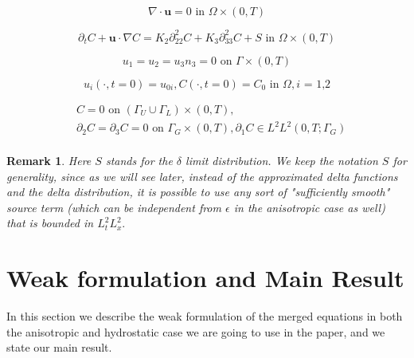 \documentclass[11pt]{article}
\newtheorem{remark}{Remark}
\begin{document}
    \begin{equation} \label{HNSC4}   
    \nabla \cdot \mathbf{u} = 0 \text{ in } \Omega \times (0,T)
    \end{equation}
    
    \begin{equation} \label{HNSC5}   
    \partial_t C + \mathbf{u} \cdot \nabla C = K_2 \partial_{22} ^ 2 C + K_3 \partial_{33} ^2 C + S \text{ in } \Omega \times (0,T)
    \end{equation}
    
    \begin{equation} \label{HNSC6}   
    u_1 = u_2 = u_3 n_3 = 0 \text{ on } \Gamma \times (0,T)
    \end{equation}
    
    \begin{equation} \label{HNSC7}   
    u_i (\cdot, t=0) = u_{0 i}, C (\cdot, t=0) = C_0 \text{ in } \Omega, \text{$i$ = 1,2}
    \end{equation}
    
    \begin{equation} \label{HNSC8}
      \begin{split}
        &C = 0 \text{ on } ( \Gamma_U \cup \Gamma_L) \times (0,T), \\
        & \partial_2 C = \partial_3 C = 0 \text{ on } \Gamma_G \times (0,T), \partial_1 C \in L^2 L^2 (0,T; \Gamma_G) \\
      \end{split}
    \end{equation}
    
  \begin{remark}
    Here $S$ stands for the $\delta$ limit distribution. We keep the notation $S$ for generality, since as we will see later, instead of the approximated delta functions and the delta distribution, it is possible to use any sort of "sufficiently smooth" source term (which can be independent from $\epsilon$ in the anisotropic case as well) that is bounded in $L^2_t L^2_x.$
  \end{remark}

\section{Weak formulation and Main Result} \label{weakformulationmainresult}

In this section we describe the weak formulation of the merged equations in both the anisotropic and hydrostatic case we are going to use in the paper, and we state our main result.
  
\end{document}
